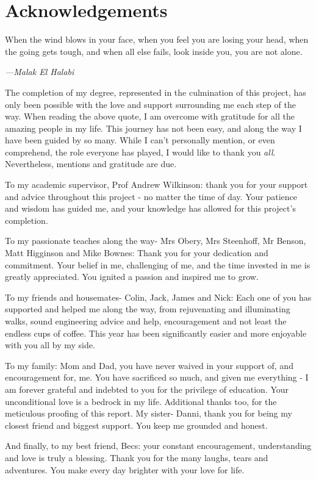 \documentclass[class=report,11pt,crop=false]{standalone}
\begin{document}
\chapter*{Acknowledgements}
\epigraph{When the wind blows in your face, when you feel you are losing your head, when the going gets tough, and when all else fails, look inside you, you are not alone.}
    {\emph{---Malak El Halabi}}
\vspace{0.5cm}

The completion of my degree, represented in the culmination of this project, has only been possible with the love and support surrounding me each step of the way. When reading the above quote, I am overcome with gratitude for all the amazing people in my life. This journey has not been easy, and along the way I have been guided by so many. While I can't personally mention, or even comprehend, the role everyone has played, I would like to thank you \emph{all}. Nevertheless, mentions and gratitude are due.

To my academic supervisor, Prof Andrew Wilkinson: thank you for your support and advice throughout this project - no matter the time of day. Your patience and wisdom has guided me, and your knowledge has allowed for this project's completion.  

To my passionate teaches along the way- Mrs Obery, Mrs Steenhoff, Mr Benson, Matt Higginson and Mike Bownes: Thank you for your dedication and commitment. Your belief in me, challenging of me, and the time invested in me is greatly appreciated. You ignited a passion and inspired me to grow. 

To my friends and housemates- Colin, Jack, James and Nick: Each one of you has supported and helped me along the way, from rejuvenating and illuminating walks, sound engineering advice and help, encouragement and not least the endless cups of coffee. This year has been significantly easier and more enjoyable with you all by my side.

To my family: Mom and Dad, you have never waived in your support of, and encouragement for, me. You have sacrificed so much, and given me everything - I am forever grateful and indebted to you for the privilege of education. Your unconditional love is a bedrock in my life. Additional thanks too, for the meticulous proofing of this report. My sister- Danni, thank you for being my closest friend and biggest support. You keep me grounded and honest.

And finally, to my best friend, Becs: your constant encouragement, understanding and love is truly a blessing. Thank you for the many laughs, tears and adventures. You make every day brighter with your love for life.
\end{document}
